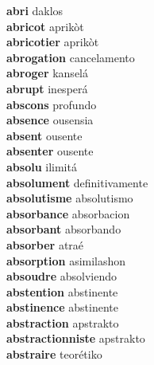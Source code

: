 \textbf{abri } daklos \\
\textbf{abricot } aprikòt \\
\textbf{abricotier } aprikòt \\
\textbf{abrogation } cancelamento \\
\textbf{abroger } kanselá \\
\textbf{abrupt } inesperá \\
\textbf{abscons } profundo \\
\textbf{absence } ousensia \\
\textbf{absent } ousente \\
\textbf{absenter } ousente \\
\textbf{absolu } ilimitá \\
\textbf{absolument } definitivamente \\
\textbf{absolutisme } absolutismo \\
\textbf{absorbance } absorbacion \\
\textbf{absorbant } absorbando \\
\textbf{absorber } atraé \\
\textbf{absorption } asimilashon \\
\textbf{absoudre } absolviendo \\
\textbf{abstention } abstinente \\
\textbf{abstinence } abstinente \\
\textbf{abstraction } apstrakto \\
\textbf{abstractionniste } apstrakto \\
\textbf{abstraire } teorétiko \\
